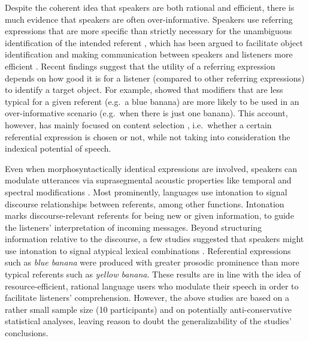 \documentclass[Review,times,sageh]{sagej}
\begin{document}
Despite the coherent idea that speakers are both rational and efficient, there is much evidence that speakers are often over-informative.
Speakers use referring expressions that are more specific than strictly necessary for the unambiguous identification of the intended referent \citep{sedivy2003pragmatic, westerbeek2015stored, rubio2016redundant}, which has been argued to facilitate object identification and making communication between speakers and listeners more efficient \citep{arts2011overspecification, paraboni2007generating, rubio2016redundant}.
Recent findings suggest that the utility of a referring expression depends on how good it is for a listener (compared to other referring expressions) to identify a target object.
For example, \citet{degen2020redundancy} showed that modifiers that are less typical for a given referent (e.g.~a blue banana) are more likely to be used in an over-informative scenario (e.g.~when there is just one banana).
This account, however, has mainly focused on content selection \citep{gatt2013we}, i.e.~whether a certain referential expression is chosen or not, while not taking into consideration the indexical potential of speech.

Even when morphosyntactically identical expressions are involved, speakers can modulate utterances via suprasegmental acoustic properties like temporal and spectral modifications \citep[e.g.,][]{ladd2008intonational}.
Most prominently, languages use intonation to signal discourse relationships between referents, among other functions.
Intonation marks discourse-relevant referents for being new or given information, to guide the listeners' interpretation of incoming messages.
Beyond structuring information relative to the discourse, a few studies suggested that speakers might use intonation to signal atypical lexical combinations \citep[e.g.~][]{dimitrova2008prosodic, dimitrova2009did}.
Referential expressions such as \emph{blue banana} were produced with greater prosodic prominence than more typical referents such as \emph{yellow banana}.
These results are in line with the idea of resource-efficient, rational language users who modulate their speech in order to facilitate listeners' comprehension.
However, the above studies are based on a rather small sample size (10 participants) and on potentially anti-conservative statistical analyses, leaving reason to doubt the generalizability of the studies' conclusions.
\end{document}
